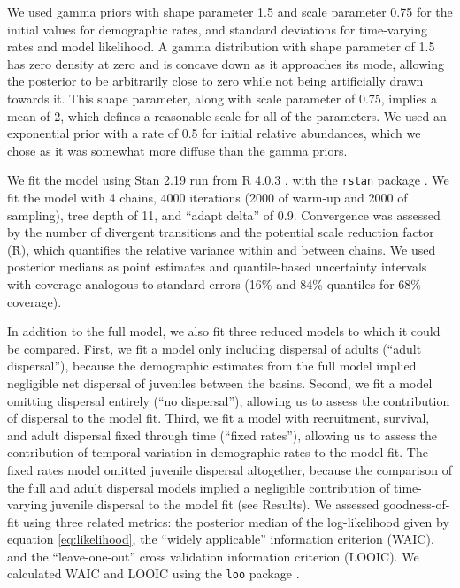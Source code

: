 \documentclass[11pt]{article}
\begin{document}
We used gamma priors with shape parameter 1.5 and scale parameter 0.75
for the initial values for demographic rates,
and standard deviations for time-varying rates and model likelihood.
A gamma distribution with shape parameter of 1.5 has zero density at zero 
and is concave down as it approaches its mode,
allowing the posterior to be arbitrarily close to zero 
while not being artificially drawn towards it.
This shape parameter, along with scale parameter of 0.75,
implies a mean of 2, 
which defines a reasonable scale for all of the parameters.
We used an exponential prior with a rate of 0.5 for initial relative abundances,
which we chose as it was somewhat more diffuse than the gamma priors.

We fit the model using Stan 2.19 \citep{carpenter2017}
run from R 4.0.3 \citep{r2020}, with the \texttt{rstan} package \citep{Stan2018}.
We fit the model with 4 chains,
4000 iterations (2000 of warm-up and 2000 of sampling),
tree depth of 11, and ``adapt delta'' of 0.9.
Convergence was assessed by the number of divergent transitions 
and the potential scale reduction factor (\^{R}),
which quantifies the relative variance within and between chains. 
We used posterior medians as point estimates
and quantile-based uncertainty intervals
with coverage analogous to standard errors
(16\% and 84\% quantiles for 68\% coverage).

In addition to the full model, 
we also fit three reduced models to which it could be compared. 
First, we fit a model only including dispersal of adults (``adult dispersal''),
because the demographic estimates from the full model 
implied negligible net dispersal of juveniles between the basins.
Second, we fit a model omitting dispersal entirely (``no dispersal''), 
allowing us to assess the contribution of dispersal to the model fit.
Third, we fit a model with recruitment, survival, and adult dispersal
fixed through time (``fixed rates''),
allowing us to assess the contribution of temporal variation in demographic rates
to the model fit.
The fixed rates model omitted juvenile dispersal altogether,
because the comparison of the full and adult dispersal models 
implied a negligible contribution of time-varying juvenile dispersal to the model fit 
(see Results). 
We assessed goodness-of-fit using three related metrics:
the posterior median of the log-likelihood given by equation \ref{eq:likelihood},
the ``widely applicable'' information criterion (WAIC),
and the ``leave-one-out'' cross validation information criterion (LOOIC).
We calculated WAIC and LOOIC using the \texttt{loo} package \citep{vehtari2020}.
\end{document}
